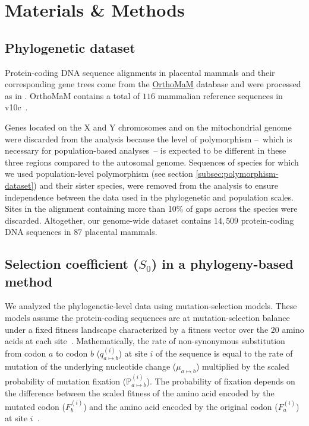 \documentclass{article}
\newcommand{\proba}{\mathbb{P}}
\newcommand{\Sphy}{S_{0}}
\begin{document}
    \section{Materials \& Methods}
    \label{sec:methods}

    \subsection{Phylogenetic dataset}\label{subsec:phylo-dataset}

    Protein-coding DNA sequence alignments in placental mammals and their corresponding gene trees come from the \href{https://www.orthomam.univ-montp2.fr}{OrthoMaM} database and were processed as in \textcite{latrille_genes_2023}.
    OrthoMaM contains a total of $116$ mammalian reference sequences in v10c~\cite{ranwez_orthomam_2007, douzery_orthomam_2014, scornavacca_orthomam_2019}.

    Genes located on the X and Y chromosomes and on the mitochondrial genome were discarded from the analysis because the level of polymorphism –~which is necessary for population-based analyses~– is expected to be different in these three regions compared to the autosomal genome.
    Sequences of species for which we used population-level polymorphism (see section \ref{subsec:polymorphism-dataset}) and their sister species, were removed from the analysis to ensure independence between the data used in the phylogenetic and population scales.
    Sites in the alignment containing more than 10\% of gaps across the species were discarded.
    Altogether, our genome-wide dataset contains $14,509$ protein-coding DNA sequences in $87$ placental mammals.

    \subsection{Selection coefficient ($\Sphy$) in a phylogeny-based method}
    \label{subsec:s-phylogeny-method}

    We analyzed the phylogenetic-level data using mutation-selection models.
    These models assume the protein-coding sequences are at mutation-selection balance under a fixed fitness landscape characterized by a fitness vector over the $20$ amino acids at each site~\cite{yang_mutationselection_2008, halpern_evolutionary_1998, rodrigue_mechanistic_2010}.
    Mathematically, the rate of non-synonymous substitution from codon $a$ to codon $b$ ($q_{a \mapsto b}^{(i)}$) at site $i$ of the sequence is equal to the rate of mutation of the underlying nucleotide change ($\mu_{a \mapsto b}$) multiplied by the scaled probability of mutation fixation ($\proba_{a \mapsto b}^{(i)}$).
    The probability of fixation depends on the difference between the scaled fitness of the amino acid encoded by the mutated codon ($F_b^{(i)}$) and the amino acid encoded by the original codon ($F_a^{(i)}$) at site $i$~\cite{wright_evolution_1931, fisher_genetical_1930}.
\end{document}
